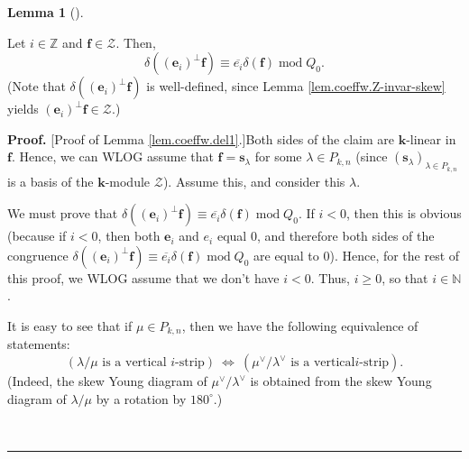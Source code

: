 \documentclass[numbers=enddot,12pt,final,onecolumn,notitlepage]{scrartcl}%
\theoremstyle{definition}
\newtheorem{lem}[theo]{Lemma}
\newenvironment{lemma}[1][]
{\begin{lem}[#1]\begin{leftbar}}
{\end{leftbar}\end{lem}}
\newenvironment{proof}[1][Proof]{\noindent\textbf{#1.} }{\ \rule{0.5em}{0.5em}}
\begin{document}
\begin{lemma}
\label{lem.coeffw.del1}Let $i\in\mathbb{Z}$ and $\mathbf{f}\in\mathcal{Z}$.
Then,%
\[
\delta\left(  \left(  \mathbf{e}_{i}\right)  ^{\perp}\mathbf{f}\right)
\equiv\overline{e_{i}}\delta\left(  \mathbf{f}\right)  \operatorname{mod}%
Q_{0}.
\]
(Note that $\delta\left(  \left(  \mathbf{e}_{i}\right)  ^{\perp}%
\mathbf{f}\right)  $ is well-defined, since Lemma
\ref{lem.coeffw.Z-invar-skew} yields $\left(  \mathbf{e}_{i}\right)  ^{\perp
}\mathbf{f}\in\mathcal{Z}$.)
\end{lemma}

\begin{proof}
[Proof of Lemma \ref{lem.coeffw.del1}.]Both sides of the claim are
$\mathbf{k}$-linear in $\mathbf{f}$. Hence, we can WLOG assume that
$\mathbf{f}=\mathbf{s}_{\lambda}$ for some $\lambda\in P_{k,n}$ (since
$\left(  \mathbf{s}_{\lambda}\right)  _{\lambda\in P_{k,n}}$ is a basis of the
$\mathbf{k}$-module $\mathcal{Z}$). Assume this, and consider this $\lambda$.

We must prove that $\delta\left(  \left(  \mathbf{e}_{i}\right)  ^{\perp
}\mathbf{f}\right)  \equiv\overline{e_{i}}\delta\left(  \mathbf{f}\right)
\operatorname{mod}Q_{0}$. If $i<0$, then this is obvious (because if $i<0$,
then both $\mathbf{e}_{i}$ and $e_{i}$ equal $0$, and therefore both sides of
the congruence $\delta\left(  \left(  \mathbf{e}_{i}\right)  ^{\perp
}\mathbf{f}\right)  \equiv\overline{e_{i}}\delta\left(  \mathbf{f}\right)
\operatorname{mod}Q_{0}$ are equal to $0$). Hence, for the rest of this proof,
we WLOG assume that we don't have $i<0$. Thus, $i\geq0$, so that
$i\in\mathbb{N}$.

It is easy to see that if $\mu\in P_{k,n}$, then we have the following
equivalence of statements:%
\begin{equation}
\left(  \lambda/\mu\text{ is a vertical }i\text{-strip}\right)
\ \Longleftrightarrow\ \left(  \mu^{\vee}/\lambda^{\vee}\text{ is a vertical
}i\text{-strip}\right)  . \label{pf.lem.coeffw.del1.eq}%
\end{equation}
(Indeed, the skew Young diagram of $\mu^{\vee}/\lambda^{\vee}$ is obtained
from the skew Young diagram of $\lambda/\mu$ by a rotation by $180^{\circ}$.)


\end{proof}
\end{document}
